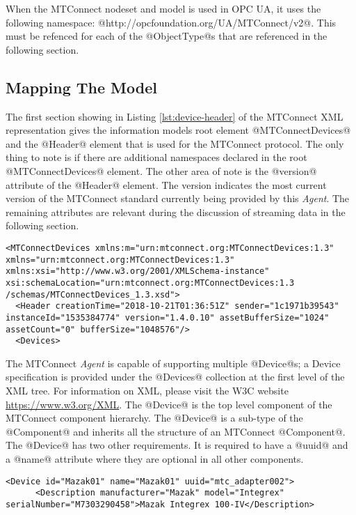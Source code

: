 When the MTConnect nodeset and model is used in OPC UA, it uses the following namespace: @http://opcfoundation.org/UA/MTConnect/v2@. This must be refenced for each of the @ObjectType@s that are referenced in the following section.

\subsection{Mapping The Model}

\lstset{language=XML,numbers=left,xleftmargin=2em}

The first section showing in Listing \ref{lst:device-header} of the MTConnect XML representation gives the information models root element @MTConnectDevices@ and the @Header@ element that is used for the MTConnect protocol. The only thing to note is if there are additional namespaces declared in the root @MTConnectDevices@ element. The other area of note is the @version@ attribute of the @Header@ element.  The version indicates the most current version of the MTConnect standard currently being provided by this \textit{Agent}. The remaining attributes are relevant during the discussion of streaming data in the following section.

\begin{lstlisting}[caption={Device Header},label={lst:device-header}]
<MTConnectDevices xmlns:m="urn:mtconnect.org:MTConnectDevices:1.3" xmlns="urn:mtconnect.org:MTConnectDevices:1.3" xmlns:xsi="http://www.w3.org/2001/XMLSchema-instance" xsi:schemaLocation="urn:mtconnect.org:MTConnectDevices:1.3 /schemas/MTConnectDevices_1.3.xsd">
  <Header creationTime="2018-10-21T01:36:51Z" sender="1c1971b39543" instanceId="1535384774" version="1.4.0.10" assetBufferSize="1024" assetCount="0" bufferSize="1048576"/>
  <Devices>
\end{lstlisting}

The MTConnect \textit{Agent} is capable of supporting multiple @Device@s; a Device specification is provided under the @Devices@ collection at the first level of the XML tree. For information on XML, please visit the W3C website \url{https://www.w3.org/XML}. The @Device@ is the top level component of the MTConnect component hierarchy. The @Device@ is a sub-type of the @Component@ and inherits all the structure of an MTConnect @Component@. The @Device@ has two other requirements. It is required to have a @uuid@ and a @name@ attribute where they are optional in all other components. 

\begin{lstlisting}[firstnumber=last,%
    caption={\texttt{Device} Element Mapping},label={lst:device-model-device}]
    <Device id="Mazak01" name="Mazak01" uuid="mtc_adapter002">
      <Description manufacturer="Mazak" model="Integrex" serialNumber="M7303290458">Mazak Integrex 100-IV</Description>
\end{lstlisting}

